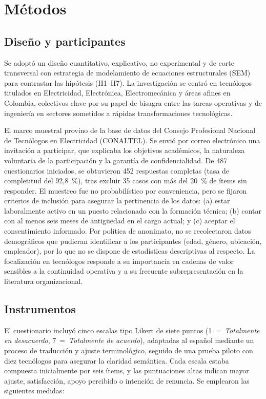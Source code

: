 \section{Métodos}

\subsection{Diseño y participantes}
Se adoptó un diseño cuantitativo, explicativo, no experimental y de corte transversal con estrategia de modelamiento de ecuaciones estructurales (SEM) para contrastar las hipótesis (H1–H7). La investigación se centró en tecnólogos titulados en Electricidad, Electrónica, Electromecánica y áreas afines en Colombia, colectivos clave por su papel de bisagra entre las tareas operativas y de ingeniería en sectores sometidos a rápidas transformaciones tecnológicas.

El marco muestral provino de la base de datos del Consejo Profesional Nacional de Tecnólogos en Electricidad (CONALTEL). Se envió por correo electrónico una invitación a participar, que explicaba los objetivos académicos, la naturaleza voluntaria de la participación y la garantía de confidencialidad. De 487 cuestionarios iniciados, se obtuvieron 452 respuestas completas (tasa de completitud del 92,8 \%), tras excluir 35 casos con más del 20 \% de ítems sin responder. El muestreo fue no probabilístico por conveniencia, pero se fijaron criterios de inclusión para asegurar la pertinencia de los datos: (a) estar laboralmente activo en un puesto relacionado con la formación técnica; (b) contar con al menos seis meses de antigüedad en el cargo actual; y (c) aceptar el consentimiento informado. Por política de anonimato, no se recolectaron datos demográficos que pudieran identificar a los participantes (edad, género, ubicación, empleador), por lo que no se dispone de estadísticas descriptivas al respecto. La focalización en tecnólogos responde a su importancia en cadenas de valor sensibles a la continuidad operativa y a su frecuente subrepresentación en la literatura organizacional.

\subsection{Instrumentos}
El cuestionario incluyó cinco escalas tipo Likert de siete puntos (1 = \emph{Totalmente en desacuerdo}, 7 = \emph{Totalmente de acuerdo}), adaptadas al español mediante un proceso de traducción y ajuste terminológico, seguido de una prueba piloto con diez tecnólogos para asegurar la claridad semántica. Cada escala estaba compuesta inicialmente por seis ítems, y las puntuaciones altas indican mayor ajuste, satisfacción, apoyo percibido o intención de renuncia. Se emplearon las siguientes medidas:

